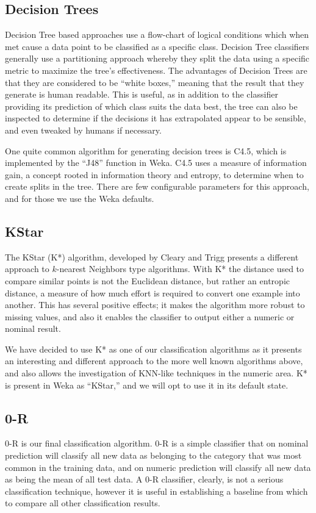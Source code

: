 \documentclass[../thesis/thesis.tex]{subfiles}
\begin{document}
\subsection{Decision Trees}
Decision Tree based approaches use a flow-chart of logical conditions which when met cause a data point to be classified as a specific class. Decision Tree classifiers generally use a partitioning approach whereby they split the data using a specific metric to maximize the tree's effectiveness. The advantages of Decision Trees are that they are considered to be ``white boxes,'' meaning that the result that they generate is human readable. This is useful, as in addition to the classifier providing its prediction of which class suits the data best, the tree can also be inspected to determine if the decisions it has extrapolated appear to be sensible, and even tweaked by humans if necessary.

One quite common algorithm for generating decision trees is C4.5, which is implemented by the ``J48'' function in Weka. C4.5 uses a measure of information gain, a concept rooted in information theory and entropy, to determine when to create splits in the tree. There are few configurable parameters for this approach, and for those we use the Weka defaults.

\subsection{KStar}
The KStar (K*) algorithm, developed by Cleary and Trigg \cite{cleary1995k} presents a different approach to $k$-nearest Neighbors type algorithms. With K* the distance used to compare similar points is not the Euclidean distance, but rather an entropic distance, a measure of how much effort is required to convert one example into another. This has several positive effects; it makes the algorithm more robust to missing values, and also it enables the classifier to output either a numeric or nominal result.

We have decided to use K* as one of our classification algorithms as it presents an interesting and different approach to the more well known algorithms above, and also allows the investigation of KNN-like techniques in the numeric area. K* is present in Weka as ``KStar,'' and we will opt to use it in its default state.

\subsection{0-R}
0-R is our final classification algorithm. 0-R is a simple classifier that on nominal prediction will classify all new data as belonging to the category that was most common in the training data, and on numeric prediction will classify all new data as being the mean of all test data. A 0-R classifier, clearly, is not a serious classification technique, however it is useful in establishing a baseline from which to compare all other classification results.
\end{document}

